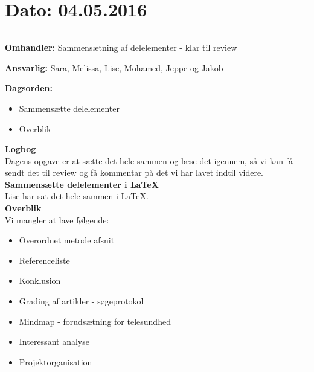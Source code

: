 \section{Dato: 04.05.2016}
\hrule

\textbf{Omhandler:} Sammensætning af delelementer - klar til review

\textbf{Ansvarlig:} Sara, Melissa, Lise, Mohamed, Jeppe og Jakob

\textbf{Dagsorden:}
\begin{itemize}
	\item Sammensætte delelementer
	\item Overblik
\end{itemize}

\textbf{Logbog}
\\
Dagens opgave er at sætte det hele sammen og læse det igennem, så vi kan få sendt det til review og få kommentar på det vi har lavet indtil videre.
\\

\textbf{Sammensætte delelementer i LaTeX}
\\
Lise har sat det hele sammen i LaTeX.
\\

\textbf{Overblik}
\\
Vi mangler at lave følgende:
\begin{itemize}
	\item Overordnet metode afsnit
	\item Referenceliste
	\item Konklusion
	\item Grading af artikler - søgeprotokol
	\item Mindmap - forudsætning for telesundhed
	\item Interessant analyse
	\item Projektorganisation
\end{itemize}